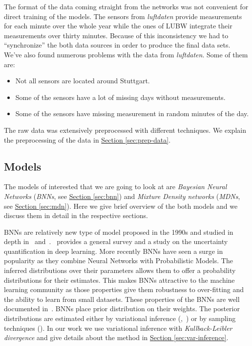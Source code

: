 \documentclass[12pt,a4paper,twoside]{scrartcl}
\numberwithin{equation}{section}
\newcommand{\refsec}[1]{\hyperref[#1]{Section \ref*{#1}}}
\begin{document}
The format of the data coming straight from the networks was not convenient for direct training of the models. The sensors from \emph{luftdaten} provide measurements for each minute over the whole year while the ones of LUBW integrate their measurements over thirty minutes. Because of this inconsistency we had to ``synchronize'' the both data sources in order to produce the final data sets. We've also found numerous problems with the data from \emph{luftdaten}. Some of them are:
\begin{itemize}
\item Not all sensors are located around Stuttgart.
\item Some of the sensors have a lot of missing days without measurements.
\item Some of the sensors have missing measurement in random minutes of the day.
\end{itemize}
The raw data was extensively preprocessed with different techniques. We explain the preprocessing of the data in \refsec{sec:prep-data}.
\subsection{Models}\label{sec:models}
The models of interested that we are going to look at are \emph{Bayesian Neural Networks} (\emph{BNNs}, see \refsec{sec:bnn}) and \emph{Mixture Density networks} (\emph{MDNs}, see \refsec{sec:mdn}). Here we give brief overview of the both models and we discuss them in detail in the respective sections.

BNNs are relatively new type of model proposed in the 1990s and studied in depth in~\cite{mackay1992} and~\cite{neal1996}.~\cite{gal2016} provides a general survey and a study on the uncertainty quantification in deep learning. More recently BNNs have seen a surge in popularity as they combine Neural Networks with Probabilistic Models. The inferred distributions over their parameters allows them to offer a probability distributions for their estimates. This makes BNNs attractive to the machine learning community as those properties give them robustness to over-fitting and the ability to learn from small datasets. These properties of the BNNs are well documented in~\cite{neal1996}. BNNs place prior distribution on their weights. The posterior distributions are estimated either by variational inference (\cite{blundell2015},~\cite{paisley2012}) or by sampling techniques (\cite{vehtari2000}). In our work we use variational inference with \emph{Kullback-Leibler divergence} and give details about the method in \refsec{sec:var-inference}.
\end{document}
